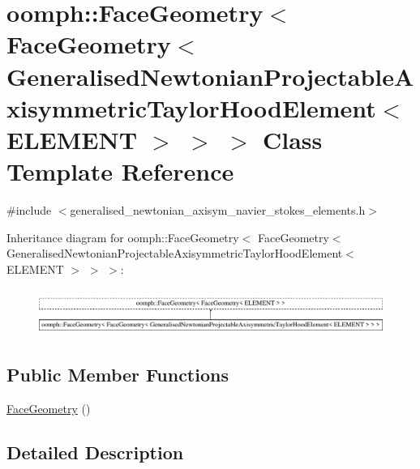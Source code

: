 \hypertarget{classoomph_1_1FaceGeometry_3_01FaceGeometry_3_01GeneralisedNewtonianProjectableAxisymmetricTaylodd4d51505b2586f1026bb874336afc4e}{}\section{oomph\+:\+:Face\+Geometry$<$ Face\+Geometry$<$ Generalised\+Newtonian\+Projectable\+Axisymmetric\+Taylor\+Hood\+Element$<$ E\+L\+E\+M\+E\+NT $>$ $>$ $>$ Class Template Reference}
\label{classoomph_1_1FaceGeometry_3_01FaceGeometry_3_01GeneralisedNewtonianProjectableAxisymmetricTaylodd4d51505b2586f1026bb874336afc4e}


{\ttfamily \#include $<$generalised\+\_\+newtonian\+\_\+axisym\+\_\+navier\+\_\+stokes\+\_\+elements.\+h$>$}

Inheritance diagram for oomph\+:\+:Face\+Geometry$<$ Face\+Geometry$<$ Generalised\+Newtonian\+Projectable\+Axisymmetric\+Taylor\+Hood\+Element$<$ E\+L\+E\+M\+E\+NT $>$ $>$ $>$\+:\begin{figure}[H]
\begin{center}
\leavevmode
\includegraphics[height=1.525886cm]{classoomph_1_1FaceGeometry_3_01FaceGeometry_3_01GeneralisedNewtonianProjectableAxisymmetricTaylodd4d51505b2586f1026bb874336afc4e}
\end{center}
\end{figure}
\subsection*{Public Member Functions}
\begin{DoxyCompactItemize}
\item 
\hyperlink{classoomph_1_1FaceGeometry_3_01FaceGeometry_3_01GeneralisedNewtonianProjectableAxisymmetricTaylodd4d51505b2586f1026bb874336afc4e_a249cbe8110ab9e5a30ca154d299d15ec}{Face\+Geometry} ()
\end{DoxyCompactItemize}


\subsection{Detailed Description}
